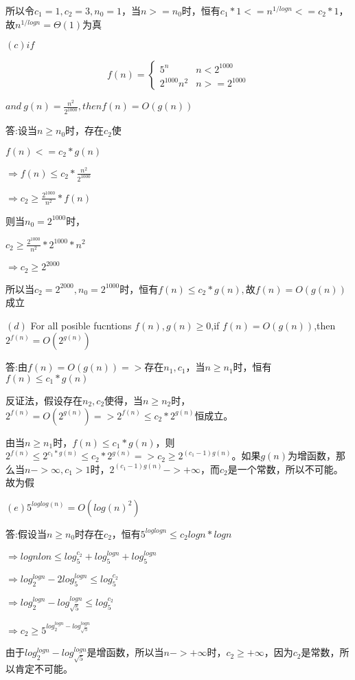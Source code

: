 \documentclass[
]{article}
\begin{document}
所以令\(c_1=1,c_2=3,n_0=1\)，当\(n>=n_0\)时，恒有\(c_1*1<=n^{1/logn}<=c_2*1\)，故\(n^{1/logn}=\Theta(1)\)为真

\((c)if\)

\[f(n)=\begin{cases}
5^n & n<2^{1000} \\
2^{1000}n^2 & n>=2^{1000}
\end{cases}\]

\(and \ g(n)=\frac{n^2}{2^{1000}},then f(n)=O(g(n))\)

答:设当\(n\geq  n_0\)时，存在\(c_2\)使

\(f(n)<=c_2*g(n)\)

\(\Rightarrow f(n)\leq c_2*\frac{n^2}{2^{1000}}\)

\(\Rightarrow c_2\geq\frac{2^{1000}}{n^2}*f(n)\)

则当\(n_0=2^{1000}\)时，

\(c_2\geq\frac{2^{1000}}{n^2}*2^{1000}*n^2\)

\(\Rightarrow c_2\geq 2^{2000}\)

所以当\(c_2=2^{2000},n_0=2^{1000}\)时，恒有\(f(n)\leq c_2*g(n),故f(n)=O(g(n))\)成立

\((d)\) For all posible fucntions \(f(n),g(n)\geq 0\),if
\(f(n)=O(g(n))\),then \(2^{f(n)}=O(2^{g(n)})\)

答:由\(f(n)=O(g(n))=>存在n_1,c_1\)，当\(n\geq n_1\)时，恒有\(f(n)\leq c_1*g(n)\)

反证法，假设存在\(n_2,c_2\)使得，当\(n\geq n_2\)时，\(2^{f(n)}=O(2^{g(n)})=>2^{f(n)}\leq c_2*2^{g(n)}\)恒成立。

由当\(n\geq  n_1\)时，\(f(n)\leq  c_1*g(n)\)，则\(2^{f(n)}\leq2^{c_1*g(n)}\leq c_2*2^{g(n)}=>c_2\geq 2^{(c_1-1)g(n)}\)。如果\(g(n)\)为增函数，那么当\(n->∞,c_1>1\)时，\(2^{(c_1-1)g(n)}->+∞\)，而\(c_2\)是一个常数，所以不可能。故为假

\((e)5^{loglog(n)}=O(log(n)^2)\)

答:假设当\(n\geq n_0\)时存在\(c_2\)，恒有\(5^{loglogn}\leq c_2logn*logn\)

\(\Rightarrow lognlon\leq log_5^{c_2}+log_5^{logn}+log_5^{logn}\)

\(\Rightarrow log_2^{logn}-2log_5^{logn}\leq log_5^{c_2}\)

\(\Rightarrow log_2^{logn}-log_{\sqrt{5}}^{logn}\leq log_5^{c_2}\)

\(\Rightarrow c_2\geq 5^{log_2^{logn}-log_{\sqrt{5}}^{logn}}\)

由于\(log_{2}^{logn}-log_{\sqrt{5}}^{logn}\)是增函数，所以当\(n->+∞\)时，\(c_2\geq+∞\)，因为\(c_2\)是常数，所以肯定不可能。
\end{document}
